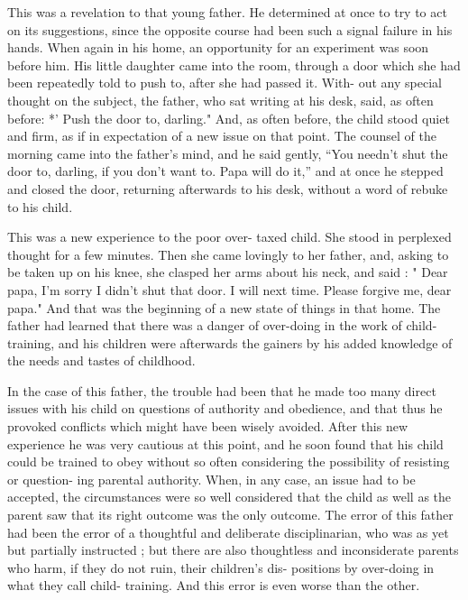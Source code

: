 \documentclass[
]{book}
\begin{document}
This was a revelation to that young father. He determined at once to try to act on its suggestions, since the opposite course had been such a signal failure in his hands. When again in his home, an opportunity for an experiment was soon before him. His little daughter came into the room, through a door which she had been repeatedly told to push to, after she had passed it. With- out any special thought on the subject, the father, who sat writing at his desk, said, as often before: *' Push the door to, darling." And, as often before, the child stood quiet and firm, as if in expectation of a new issue on that point. The counsel of the morning came into the father's mind, and he said gently, ``You needn't shut the door to, darling, if you don't want to. Papa will do it,'' and at once he stepped and closed the door, returning afterwards to his desk, without a word of rebuke to his child.

This was a new experience to the poor over- taxed child. She stood in perplexed thought for a few minutes. Then she came lovingly to her father, and, asking to be taken up on his knee, she clasped her arms about his neck, and said : " Dear papa, I'm sorry I didn't shut that door. I will next time. Please forgive me, dear papa." And that was the beginning of a new state of things in that home. The father had learned that there was a danger of over-doing in the work of child-training, and his children were afterwards the gainers by his added knowledge of the needs and tastes of childhood.

In the case of this father, the trouble had been that he made too many direct issues with his child on questions of authority and obedience, and that thus he provoked conflicts which might have been wisely avoided. After this new experience he was very cautious at this point, and he soon found that his child could be trained to obey without so often considering the possibility of resisting or question- ing parental authority. When, in any case, an issue had to be accepted, the circumstances were so well considered that the child as well as the parent saw that its right outcome was the only outcome. The error of this father had been the error of a thoughtful and deliberate disciplinarian, who was as yet but partially instructed ; but there are also thoughtless and inconsiderate parents who harm, if they do not ruin, their children's dis- positions by over-doing in what they call child- training. And this error is even worse than the other.
\end{document}

